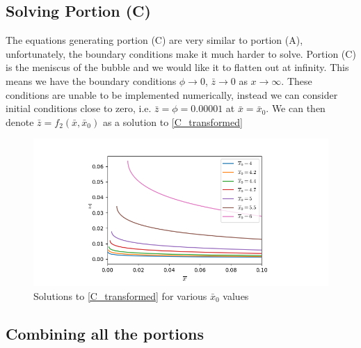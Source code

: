 \subsection{Solving Portion (C)}

The equations generating portion (C) are very similar to portion (A), unfortunately, the boundary conditions make it much harder to solve. Portion (C) is the meniscus of the bubble and we would like it to flatten out at infinity. This means we have the boundary conditions $\phi \rightarrow 0$, $\bar{z} \rightarrow 0$ as $x \rightarrow \infty$. These conditions are unable to be implemented numerically, instead we can consider initial conditions close to zero, i.e. $\bar{z}=\phi=0.00001$ at $\bar{x}=\bar{x}_0$. We can then denote $\bar{z}=f_2(\bar{x},\bar{x}_0)$ as a solution to \ref{C_transformed}

\begin{figure}[hb]
    \centering
    \includegraphics[width=0.85\linewidth]{WriteUp/images/menisc.png}
    \caption{Solutions to \ref{C_transformed} for various $\bar{x}_0$ values}
    \label{fig:7}
\end{figure}

\subsection{Combining all the portions}

